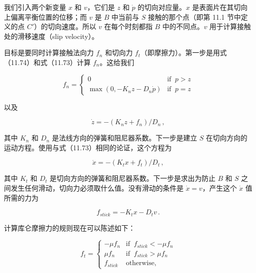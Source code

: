 \documentclass[10pt,a4paper]{book}
\theoremstyle{thmstyle} %
\theoremstyle{defstyle} %
\theoremstyle{prostyle} %
\begin{document}
我们引入两个新变量 $x$ 和 $v$，它们是 $z$ 和 $\dot{p}$ 的切向对应量。$x$ 是表面片在其切向上偏离平衡位置的位移；而 $v$ 是 $B$ 中当前与 $S$ 接触的那个点（即第 11.1 节中定义的点 $C'$）的切向速度。所以 $v$ 在每个时刻都指 $B$ 中的不同点。$v$ 用于计算接触处的滑移速度（slip velocity）。



目标是要同时计算接触法向力 $f_{n}$ 和切向力 $f_{t}$（即摩擦力）。第一步是用式（11.74）和式（11.73）计算 $f_{n}$。这给我们



$$
f _ { n } = \left\{ \begin{array}{ll} { 0 } & { \mathrm { i f } \; \; p > z } \\{ \operatorname* { m a x } ( 0 , - K _ { n } z - D _ { n } \dot { p } ) } & { \mathrm { i f } \; \; p = z } \end{array} \right.
$$



以及



$$
\dot { z } = - ( K _ { n } z + f _ { n } ) / D _ { n } \, ,
$$



其中 $K_{n}$ 和 $D_{n}$ 是法线方向的弹簧和阻尼器系数。下一步是建立 $S$ 在切向方向的运动方程。使用与式（11.73）相同的论证，这个方程为



$$
\dot { x } = - ( K _ { t } x + f _ { t } ) / D _ { t } \, ,
$$



其中 $K_{t}$ 和 $D_{t}$ 是切向方向的弹簧和阻尼器系数。下一步是求出为防止 $B$ 和 $S$ 之间发生任何滑动，切向力必须取什么值。没有滑动的条件是 $\dot{x}=v$，产生这个 $\dot{x}$ 值所需的力为



$$
f _ { s t i c k } = - K _ { t } x - D _ { t } v \, .
$$



计算库仑摩擦力的规则现在可以陈述如下：



$$
f _ { t } = \left\{ \begin{array}{ll} { - \mu f _ { n } } & { \mathrm { i f } \; \; f _ { s t i c k } < - \mu f _ { n } } \\{ \mu f _ { n } } & { \mathrm { i f } \; \; f _ { s t i c k } > \mu f _ { n } } \\{ f _ { s t i c k } } & { \mathrm { o t h e r w i s e } , } \end{array} \right.
$$
\end{document}
